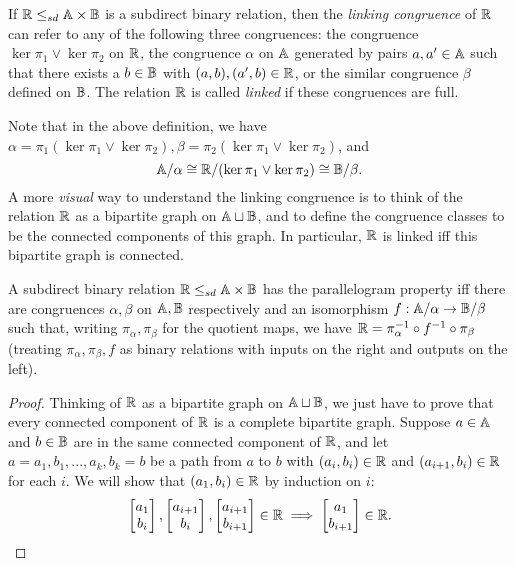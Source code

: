 \documentclass[letterpaper,11pt]{article}
\begin{document}
\begin{defn} If $\mathbb{R} \le_{sd} \mathbb{A}\times \mathbb{B}$ is a subdirect binary relation, then the \emph{linking congruence} of $\mathbb{R}$ can refer to any of the following three congruences: the congruence $\ker \pi_1 \vee \ker \pi_2$ on $\mathbb{R}$, the congruence $\alpha$ on $\mathbb{A}$ generated by pairs $a,a' \in \mathbb{A}$ such that there exists a $b \in \mathbb{B}$ with $(a,b), (a',b) \in \mathbb{R}$, or the similar congruence $\beta$ defined on $\mathbb{B}$. The relation $\mathbb{R}$ is called \emph{linked} if these congruences are full.
\end{defn}

Note that in the above definition, we have $\alpha = \pi_1(\ker \pi_1 \vee \ker \pi_2), \beta = \pi_2(\ker \pi_1 \vee \ker \pi_2)$, and
\[
\mathbb{A}/\alpha \cong \mathbb{R}/(\ker \pi_1 \vee \ker \pi_2) \cong \mathbb{B}/\beta.
\]
A more \emph{visual} way to understand the linking congruence is to think of the relation $\mathbb{R}$ as a bipartite graph on $\mathbb{A} \sqcup \mathbb{B}$, and to define the congruence classes to be the connected components of this graph. In particular, $\mathbb{R}$ is linked iff this bipartite graph is connected.

\begin{prop} A subdirect binary relation $\mathbb{R} \le_{sd} \mathbb{A}\times \mathbb{B}$ has the parallelogram property iff there are congruences $\alpha,\beta$ on $\mathbb{A},\mathbb{B}$ respectively and an isomorphism $f : \mathbb{A}/\alpha \rightarrow \mathbb{B}/\beta$ such that, writing $\pi_{\alpha},\pi_{\beta}$ for the quotient maps, we have $\mathbb{R} = \pi_{\alpha}^{-1} \circ f^{-1} \circ \pi_{\beta}$ (treating $\pi_\alpha, \pi_\beta, f$ as binary relations with inputs on the right and outputs on the left).
\end{prop}
\begin{proof} Thinking of $\mathbb{R}$ as a bipartite graph on $\mathbb{A} \sqcup \mathbb{B}$, we just have to prove that every connected component of $\mathbb{R}$ is a complete bipartite graph. Suppose $a \in \mathbb{A}$ and $b \in \mathbb{B}$ are in the same connected component of $\mathbb{R}$, and let $a = a_1, b_1, ..., a_k, b_k = b$ be a path from $a$ to $b$ with $(a_i,b_i) \in \mathbb{R}$ and $(a_{i+1},b_i) \in \mathbb{R}$ for each $i$. We will show that $(a_1,b_i) \in \mathbb{R}$ by induction on $i$:
\[
\begin{bmatrix} a_1\\ b_i \end{bmatrix}, \begin{bmatrix} a_{i+1}\\ b_i\end{bmatrix}, \begin{bmatrix} a_{i+1}\\ b_{i+1}\end{bmatrix} \in \mathbb{R} \implies \begin{bmatrix} a_1\\ b_{i+1}\end{bmatrix} \in \mathbb{R}.\qedhere
\]
\end{proof}
\end{document}
